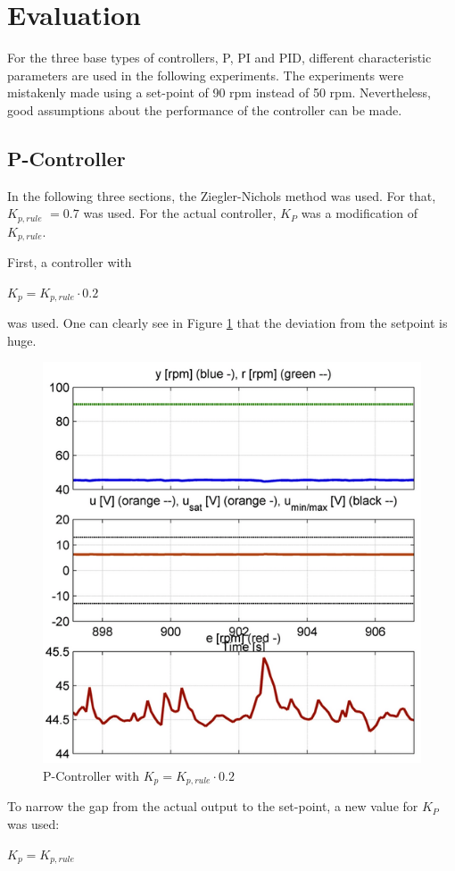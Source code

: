 \section{Evaluation}

For the three base types of controllers, P, PI and PID, different characteristic parameters are used in the following experiments. The experiments were mistakenly made using a set-point of 90 rpm instead of 50 rpm. Nevertheless, good assumptions about the performance of the controller can be made.

\subsection{P-Controller}
In the following three sections, the Ziegler-Nichols method was used. For that, \textbf{$K_{p,rule}$} $= 0.7$ was used. For the actual controller, $K_P$ was a modification of $K_{p,rule}$.

First, a controller with
\begin{center}
{$K_{p}= K_{p,rule}\cdot{0.2}$}
\end{center}

was used. One can clearly see in Figure \ref{fig:p_controller2} that the deviation from the setpoint is huge.

\begin{figure}[H]
\begin{center}
\includegraphics[width=0.5\linewidth]{images/general/P/p_controller02}
\end{center}
\caption{P-Controller with $ K_{p}= K_{p,rule}\cdot{0.2}$}
\label{fig:p_controller2}
\end{figure}

To narrow the gap from the actual output to the set-point, a new value for $K_P$ was used:

\begin{center}
{$K_{p}= K_{p,rule}$}
\end{center}

